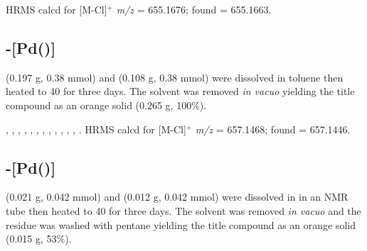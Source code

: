 HRMS calcd for  [M-Cl]$^+$ \emph{m/z} = 655.1676; found = 655.1663.


\subsection*{\trans{}-[Pd(\tButhixantphos)]}


\tBuThixantphos{} (0.197 g, 0.38 mmol) and \ce{[Pd(cod)Cl2]} (0.108 g, 0.38 mmol) were dissolved in toluene then heated to 40\degC{} for three days.  The solvent was removed \emph{in vacuo} yielding the title compound as an orange solid (0.265 g, 100\%).



,
,
,
,
,
,
,
,
,
,
,
,
.
HRMS calcd for  [M-Cl]$^+$ \emph{m/z} = 657.1468; found = 657.1446.


\subsection*{\trans{}-[Pd(\tBuxantphos)]}

\tBuXantphos{} (0.021 g, 0.042 mmol) and \ce{[Pd(cod)Cl2]} (0.012 g, 0.042 mmol) were dissolved in  in an NMR tube then heated to 40\degC{} for three days.  The solvent was removed \emph{in vacuo} and the residue was washed with pentane yielding the title compound as an orange solid (0.015 g, 53\%).


